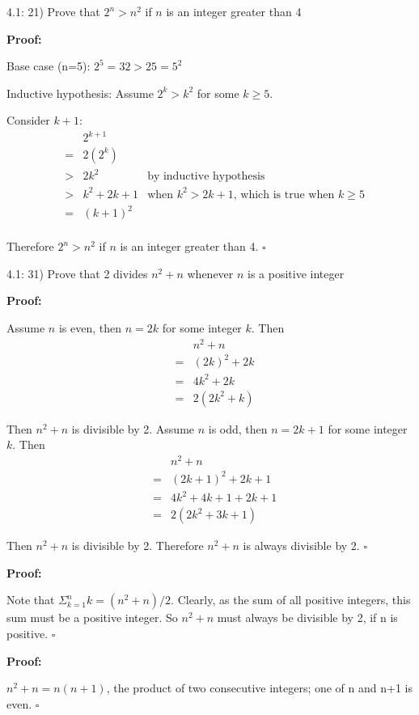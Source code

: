 \documentclass{article}
\newenvironment{proof}
{\color{PineGreen}\begin{list}{}%
         {\setlength{\leftmargin}{1cm}}%
         \item[]%
        \textbf{Proof:}
        
        }
{ $\square$\end{list}}
\begin{document}
4.1: 21) Prove that $2^n > n^2$ if $n$ is an integer greater than 4

\begin{proof}
Base case (n=5):
$2^5 = 32 > 25 = 5^2$

Inductive hypothesis:
Assume $2^k > k^2$ for some $k \geq 5$.

Consider $k+1$:
\[\begin{array}{rclr}
&& 2^{k+1}& \\
&=& 2(2^k) & \\
&>& 2k^2 & \textrm{by inductive hypothesis} \\
&>& k^2 + 2k + 1 & \textrm{when }k^2>2k+1\textrm{, which is true when }k \geq 5 \\
&=& (k+1)^2 &\\
\end{array}\]

Therefore $2^n > n^2$ if $n$ is an integer greater than 4.\end{proof}

4.1: 31) Prove that 2 divides $n^2 + n$ whenever $n$ is a positive integer

\begin{proof} Assume $n$ is even, then $n = 2k$ for some integer $k$. Then 
\[\begin{array}{rcl}
&&n^2 + n \\
&=& (2k)^2 + 2k \\
&=& 4k^2 + 2k \\
&=& 2(2k^2 + k)
\end{array}\]

Then $n^2 + n$ is divisible by 2. Assume $n$ is odd, then $n = 2k+1$ for some integer $k$. Then 
\[\begin{array}{rcl}
&&n^2 + n \\
&=& (2k+1)^2 + 2k+1\\
&=& 4k^2 +4k + 1 + 2k + 1 \\
&=& 2(2k^2 + 3k + 1)
\end{array}\]

Then $n^2 + n$ is divisible by 2. Therefore $n^2 + n$ is always divisible by 2.\end{proof}

\begin{proof}Note that $\Sigma^n_{k=1} k = (n^2+n)/2$. Clearly, as the sum of all positive integers, 
this sum must be a positive integer. So $n^2+n$ must always be divisible by 2, if n is positive.\end{proof}

\begin{proof}
$n^2 + n = n(n+1)$, the product of two consecutive integers; one of n and n+1 is even.
\end{proof}
\end{document}

